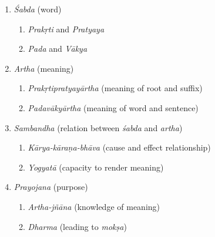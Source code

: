 \begin{enumerate}
\itemsep=0pt
\item \textit{Śabda} (word)
 
\begin{enumerate}
\itemsep=0pt
\item \textit{Prakṛti} and \textit{Pratyaya}

 \item \textit{Pada} and \textit{Vākya}
\end{enumerate}

 \item \textit{Artha} (meaning)
 
\begin{enumerate}
\itemsep=0pt
\item \textit{Prakṛtipratyayārtha} (meaning of root and suffix)

 \item \textit{Padavākyārtha} (meaning of word and sentence) 
\end{enumerate}

 \item \textit{Sambandha} (relation between \textit{śabda} and \textit{artha})
 
\begin{enumerate}
\itemsep=0pt
\item \textit{Kārya-kāraṇa-bhāva} (cause and effect relationship)

 \item \textit{Yogyatā} (capacity to render meaning)
\end{enumerate}

 \item \textit{Prayojana} (purpose)
 
\begin{enumerate}
\itemsep=0pt
\item \textit{Artha-jñāna} (knowledge of meaning)

 \item \textit{Dharma} (leading to \textit{mokṣa})
\end{enumerate}

\end{enumerate}

